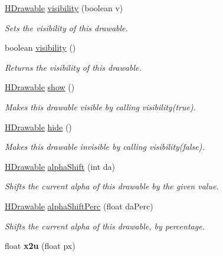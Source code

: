 \begin{DoxyCompactItemize}
\hyperlink{classhype_1_1core_1_1drawable_1_1_h_drawable}{H\-Drawable} \hyperlink{classhype_1_1core_1_1drawable_1_1_h_drawable_abad4b596d0577a3655ff0827aac62ee2}{visibility} (boolean v)
\begin{DoxyCompactList}\small\item\em Sets the visibility of this drawable. \end{DoxyCompactList}\item 
boolean \hyperlink{classhype_1_1core_1_1drawable_1_1_h_drawable_af123e1795e471825ca608a2b90e88163}{visibility} ()
\begin{DoxyCompactList}\small\item\em Returns the visibility of this drawable. \end{DoxyCompactList}\item 
\hyperlink{classhype_1_1core_1_1drawable_1_1_h_drawable}{H\-Drawable} \hyperlink{classhype_1_1core_1_1drawable_1_1_h_drawable_acab0f90892d84b754e9cc769ba9dc177}{show} ()
\begin{DoxyCompactList}\small\item\em Makes this drawable visible by calling {\ttfamily visibility(true)}. \end{DoxyCompactList}\item 
\hyperlink{classhype_1_1core_1_1drawable_1_1_h_drawable}{H\-Drawable} \hyperlink{classhype_1_1core_1_1drawable_1_1_h_drawable_a39dff6aef37343a177538d61ae751fb3}{hide} ()
\begin{DoxyCompactList}\small\item\em Makes this drawable invisible by calling {\ttfamily visibility(false)}. \end{DoxyCompactList}\item 
\hyperlink{classhype_1_1core_1_1drawable_1_1_h_drawable}{H\-Drawable} \hyperlink{classhype_1_1core_1_1drawable_1_1_h_drawable_a79d1c2ca4a8f1744b1625907213db1c6}{alpha\-Shift} (int da)
\begin{DoxyCompactList}\small\item\em Shifts the current alpha of this drawable by the given value. \end{DoxyCompactList}\item 
\hyperlink{classhype_1_1core_1_1drawable_1_1_h_drawable}{H\-Drawable} \hyperlink{classhype_1_1core_1_1drawable_1_1_h_drawable_a94a0493a38fe09e271e30eb8bcbfadf0}{alpha\-Shift\-Perc} (float da\-Perc)
\begin{DoxyCompactList}\small\item\em Shifts the current alpha of this drawable, by percentage. \end{DoxyCompactList}\item 
\hypertarget{classhype_1_1core_1_1drawable_1_1_h_drawable_aefc0cf9066fe2bf147a4178b7c6bf192}{float {\bfseries x2u} (float px)}\label{classhype_1_1core_1_1drawable_1_1_h_drawable_aefc0cf9066fe2bf147a4178b7c6bf192}


\end{DoxyCompactItemize}
